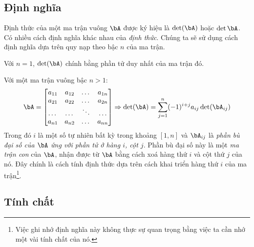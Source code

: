 \subsection{Định nghĩa} %
\label{sub:dinh_nghia}

Định thức của một ma trận vuông $\bA$ được ký hiệu là $\det(\bA)$ hoặc $\det
\bA$. Có nhiều cách định nghĩa khác nhau của \textit{định thức}. Chúng ta sẽ sử
dụng cách định nghĩa dựa trên quy nạp theo bậc $n$ của ma trận.

Với $n = 1$, $\det(\bA)$ chính bằng phần tử duy nhất của ma trận đó.

Với một ma trận vuông bậc $n>1$:
\begin{equation}
    \bA = \left[
\begin{matrix}
    a_{11} & a_{12} & \dots & a_{1n} \\
    a_{21} & a_{22} & \dots & a_{2n} \\
    \dots & \dots & \ddots & \dots \\
    a_{n1} & a_{n2} & \dots & a_{nn}
\end{matrix}
\right] \Rightarrow \det(\bA) = \sum_{j=1}^n (-1)^{i+j} a_{ij}\det(\bA_{ij})
\end{equation}
Trong đó $i$ là một số tự nhiên bất kỳ trong khoảng $[1, n]$ và $\bA_{ij}$ là
\textit{phần bù đại số của $\bA$ ứng với phần tử ở hàng $i$, cột $j$}. Phần bù
đại số này là một \textit{ma trận con} của $\bA$, nhận được từ $\bA$ bằng cách
xoá hàng thứ $i$ và cột thứ $j$ của nó. Đây chính là cách tính định thức dựa
trên cách khai triển hàng thứ $i$ của ma trận\footnote{Việc ghi nhớ định nghĩa
này không thực sự quan trọng bằng việc ta cần nhớ một vài tính chất của nó.}.


\subsection{Tính chất} %
\label{sub:tinh_chat}

